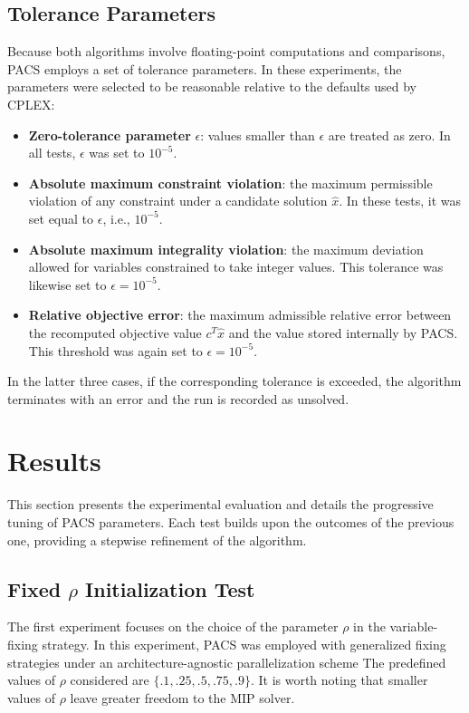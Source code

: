 \subsection{Tolerance Parameters}
Because both algorithms involve floating-point computations and comparisons, PACS employs a set of tolerance parameters. In these experiments, the parameters were selected to be reasonable relative to the defaults used by CPLEX:
\begin{itemize}
    \item \textbf{Zero-tolerance parameter} $\epsilon$: values smaller than $\epsilon$ are treated as zero. In all tests, $\epsilon$ was set to $10^{-5}$.
    \item \textbf{Absolute maximum constraint violation}: the maximum permissible violation of any constraint under a candidate solution $\hat{x}$. In these tests, it was set equal to $\epsilon$, i.e., $10^{-5}$.
    \item \textbf{Absolute maximum integrality violation}: the maximum deviation allowed for variables constrained to take integer values. This tolerance was likewise set to $\epsilon = 10^{-5}$.
    \item \textbf{Relative objective error}: the maximum admissible relative error between the recomputed objective value $c^T \hat{x}$ and the value stored internally by PACS. This threshold was again set to $\epsilon = 10^{-5}$.  
\end{itemize}  
In the latter three cases, if the corresponding tolerance is exceeded, the algorithm terminates with an error and the run is recorded as unsolved.  

\section{Results}\label{sec:result}
This section presents the experimental evaluation and details the progressive tuning of PACS parameters. Each test builds upon the outcomes of the previous one, providing a stepwise refinement of the algorithm.

\subsection{Fixed $\rho$ Initialization Test}\label{sec:test_fix_rho}
The first experiment focuses on the choice of the parameter $\rho$ in the variable-fixing strategy.  
In this experiment, PACS was employed with generalized fixing strategies under an architecture-agnostic parallelization scheme
The predefined values of $\rho$ considered are $\{.1, .25, .5, .75, .9\}$.  
It is worth noting that smaller values of $\rho$ leave greater freedom to the MIP solver.  

